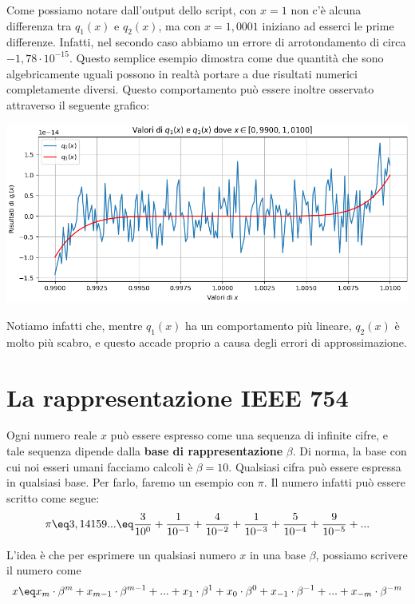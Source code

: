 \begin{example}
    Come possiamo notare dall'output dello script, con $x = 1$ non c'è alcuna differenza tra $q_1(x)$ e $q_2(x)$, ma con $x = 1,0001$ iniziano ad esserci le prime differenze. Infatti, nel secondo caso abbiamo un errore di arrotondamento di circa $-1,78 \cdot 10^{-15}$. Questo semplice esempio dimostra come due quantità che sono algebricamente uguali possono in realtà portare a due risultati numerici completamente diversi.
    \nl
    Questo comportamento può essere inoltre osservato attraverso il seguente grafico:
    \begin{center}
        \includegraphics[width = \linewidth]{assets/image-001.png}
    \end{center}

    Notiamo infatti che, mentre $q_1(x)$ ha un comportamento più lineare, $q_2(x)$ è molto più scabro, e questo accade proprio a causa degli errori di approssimazione.
\end{example}

\section{La rappresentazione IEEE 754}

Ogni numero reale $x$ può essere espresso come una sequenza di infinite cifre, e tale sequenza dipende dalla \textbf{base di rappresentazione} $\beta$. Di norma, la base con cui noi esseri umani facciamo calcoli è $\beta = 10$.
\nl
Qualsiasi cifra può essere espressa in qualsiasi base. Per farlo, faremo un esempio con $\pi$. Il numero infatti può essere scritto come segue:
\[ \pi \eq 3,14159... \eq \frac{3}{10^0} + \frac{1}{10^{-1}} + \frac{4}{10^{-2}} + \frac{1}{10^{-3}} + \frac{5}{10^{-4}} + \frac{9}{10^{-5}} + ... \]

L'idea è che per esprimere un qualsiasi numero $x$ in una base $\beta$, possiamo scrivere il numero come
\[ x \eq x_m \cdot \beta^m + x_{m-1} \cdot \beta^{m-1} + ... + x_{1} \cdot \beta^{1} + x_{0} \cdot \beta^{0} + x_{-1} \cdot \beta^{-1} + ... + x_{-m} \cdot \beta^{-m} \]

